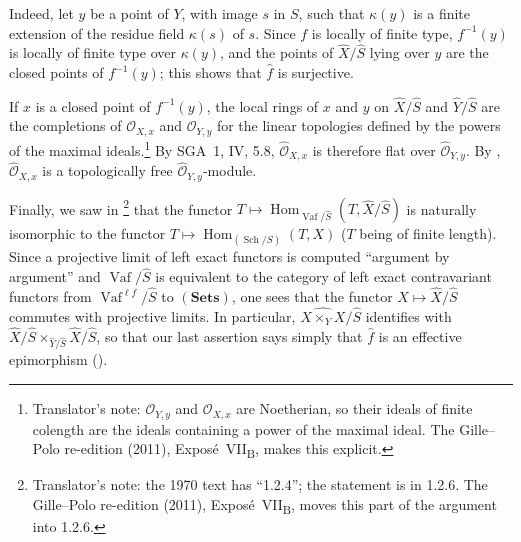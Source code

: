 Indeed, let \(y\) be a point of \(Y\), with image \(s\) in \(S\), such
that \(\kappa(y)\) is a finite extension of the residue field
\(\kappa(s)\) of \(s\). Since \(f\) is locally of finite type,
\(f^{-1}(y)\) is locally of finite type over \(\kappa(y)\), and the
points of \(\widehat X/\widehat S\) lying over \(y\) are the closed points
of \(f^{-1}(y)\); this shows that \(\widehat f\) is surjective.

If \(x\) is a closed point of \(f^{-1}(y)\), the local rings of \(x\) and
\(y\) on \(\widehat X/\widehat S\) and \(\widehat Y/\widehat S\) are the
completions of \(\mathcal O_{X,x}\) and \(\mathcal O_{Y,y}\) for the
linear topologies defined by the powers of the maximal
ideals.\footnote{Translator's note: \(\mathcal O_{Y,y}\) and \(\mathcal O_{X,x}\) are Noetherian, so their
ideals of finite colength are the ideals containing a power of the maximal ideal. The Gille--Polo
re-edition (2011), Expos\'e~VII\textsubscript{B}, makes this explicit.} By SGA~1, IV, 5.8,
\(\widehat{\mathcal O}_{X,x}\) is therefore flat over
\(\widehat{\mathcal O}_{Y,y}\). By ,
\(\widehat{\mathcal O}_{X,x}\) is a topologically free
\(\widehat{\mathcal O}_{Y,y}\)-module.

Finally, we saw in \footnote{Translator's note: the 1970 text has
``1.2.4''; the statement is in 1.2.6. The Gille--Polo re-edition (2011), Expos\'e~VII\textsubscript{B},
moves this part of the argument into 1.2.6.} that the functor
\(T\mapsto\operatorname{Hom}_{\operatorname{Vaf}/\widehat S}(T,\widehat X/\widehat S)\)
is naturally isomorphic to the functor
\(T\mapsto\operatorname{Hom}_{(\operatorname{Sch}/S)}(T,X)\) (\(T\) being
of finite length). Since a projective limit of left exact functors is
computed ``argument by argument'' and \(\operatorname{Vaf}/\widehat S\)
is equivalent to the category of left exact contravariant functors from
\(\operatorname{Vaf}^{\ell f}/\widehat S\) to \((\mathbf{Sets})\), one
sees that the functor \(X\mapsto\widehat X/\widehat S\) commutes with
projective limits. In particular,
\(\widehat{X\times_YX}/\widehat S\) identifies with
\(\widehat X/\widehat S\times_{\widehat Y/\widehat S}\widehat X/\widehat S\),
so that our last assertion says simply that \(\widehat f\) is an
effective epimorphism ().
